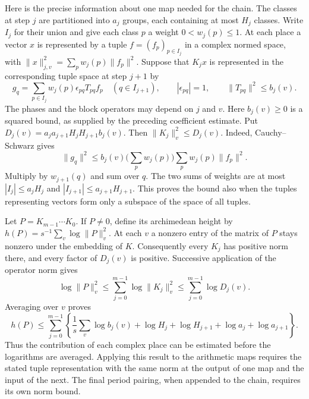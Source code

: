 \documentclass[11pt,letterpaper]{article}
\begin{document}
Here is the precise information about one map needed for the chain.
The classes at step $j$ are partitioned into $a_j$ groups, each
containing at most $H_j$ classes. Write $I_j$ for their union and give
each class $p$ a weight $0<w_j(p)\le1$. At each place a vector $x$ is
represented by a tuple $f=(f_p)_{p\in I_j}$ in a complex normed space,
with $\|x\|_{j,v}^2=\sum_p w_j(p)\|f_p\|^2$. Suppose that $K_jx$ is
represented in the corresponding tuple space at step $j+1$ by
\begin{equation}\label{D:154}
    g_q=\sum_{p\in I_j}w_j(p)\epsilon_{pq}T_{pq}f_p
          \quad(q\in I_{j+1}),\qquad
    |\epsilon_{pq}|=1,\qquad \|T_{pq}\|^2\le b_j(v).
\end{equation}
The phases and the block operators may depend on $j$ and $v$.
Here $b_j(v)\ge0$ is a squared bound, as supplied by the preceding
coefficient estimate. Put $D_j(v)=a_j a_{j+1}H_jH_{j+1}b_j(v)$.
Then $\|K_j\|_v^2\le D_j(v)$. Indeed, Cauchy--Schwarz gives
\begin{equation}\label{D:155}
   \|g_q\|^2\le b_j(v)\Big(\sum_p w_j(p)\Big)
                  \sum_p w_j(p)\|f_p\|^2 .
\end{equation}
Multiply by $w_{j+1}(q)$ and sum over $q$. The two sums of weights are
at most $|I_j|\le a_jH_j$ and $|I_{j+1}|\le a_{j+1}H_{j+1}$.
This proves the bound also when the tuples representing vectors form
only a subspace of the space of all tuples.

Let $P=K_{m-1}\cdots K_0$. If $P\ne0$, define its archimedean
height by $h(P)=s^{-1}\sum_v\log\|P\|_v^2$. At each $v$ a nonzero
entry of the matrix of $P$ stays nonzero under the embedding of $K$.
Consequently every $K_j$ has positive norm there, and every factor of
$D_j(v)$ is positive. Successive application of the operator norm gives
\begin{equation}\label{D:156}
   \log\|P\|_v^2\le\sum_{j=0}^{m-1}\log\|K_j\|_v^2
                  \le\sum_{j=0}^{m-1}\log D_j(v).
\end{equation}
Averaging over $v$ proves
\begin{equation}\label{D:157}
 h(P)\le\sum_{j=0}^{m-1}\left\{
  \frac1s\sum_v\log b_j(v)
    +\log H_j+\log H_{j+1}+\log a_j+\log a_{j+1}\right\}.
\end{equation}
Thus the contribution of each complex place can be estimated before
the logarithms are averaged. Applying this result to the arithmetic
maps requires the stated tuple representation with the same norm at
the output of one map and the input of the next. The final period
pairing, when appended to the chain, requires its own norm bound.
\end{document}
